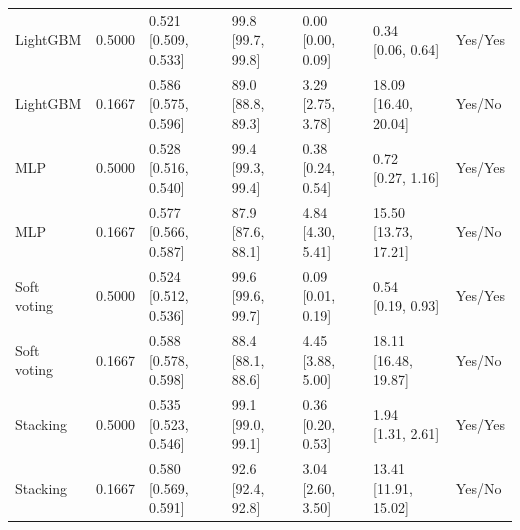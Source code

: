 \begin{table}[htbp]
{\begin{tabular}{lllllll}
LightGBM & 0.5000 & \shortstack{{0.521} \\ {[0.509, 0.533]}} & \shortstack{{99.8} \\ {[99.7, 99.8]}} & \shortstack{{0.00} \\ {[0.00, 0.09]}} & \shortstack{{0.34} \\ {[0.06, 0.64]}} & Yes/Yes \\
LightGBM & 0.1667 & \shortstack{{0.586} \\ {[0.575, 0.596]}} & \shortstack{{89.0} \\ {[88.8, 89.3]}} & \shortstack{{3.29} \\ {[2.75, 3.78]}} & \shortstack{{18.09} \\ {[16.40, 20.04]}} & Yes/No \\
MLP & 0.5000 & \shortstack{{0.528} \\ {[0.516, 0.540]}} & \shortstack{{99.4} \\ {[99.3, 99.4]}} & \shortstack{{0.38} \\ {[0.24, 0.54]}} & \shortstack{{0.72} \\ {[0.27, 1.16]}} & Yes/Yes \\
MLP & 0.1667 & \shortstack{{0.577} \\ {[0.566, 0.587]}} & \shortstack{{87.9} \\ {[87.6, 88.1]}} & \shortstack{{4.84} \\ {[4.30, 5.41]}} & \shortstack{{15.50} \\ {[13.73, 17.21]}} & Yes/No \\
Soft voting & 0.5000 & \shortstack{{0.524} \\ {[0.512, 0.536]}} & \shortstack{{99.6} \\ {[99.6, 99.7]}} & \shortstack{{0.09} \\ {[0.01, 0.19]}} & \shortstack{{0.54} \\ {[0.19, 0.93]}} & Yes/Yes \\
Soft voting & 0.1667 & \shortstack{{0.588} \\ {[0.578, 0.598]}} & \shortstack{{88.4} \\ {[88.1, 88.6]}} & \shortstack{{4.45} \\ {[3.88, 5.00]}} & \shortstack{{18.11} \\ {[16.48, 19.87]}} & Yes/No \\
Stacking & 0.5000 & \shortstack{{0.535} \\ {[0.523, 0.546]}} & \shortstack{{99.1} \\ {[99.0, 99.1]}} & \shortstack{{0.36} \\ {[0.20, 0.53]}} & \shortstack{{1.94} \\ {[1.31, 2.61]}} & Yes/Yes \\
Stacking & 0.1667 & \shortstack{{0.580} \\ {[0.569, 0.591]}} & \shortstack{{92.6} \\ {[92.4, 92.8]}} & \shortstack{{3.04} \\ {[2.60, 3.50]}} & \shortstack{{13.41} \\ {[11.91, 15.02]}} & Yes/No \\
\bottomrule
\end{tabular}
}
\end{table}

